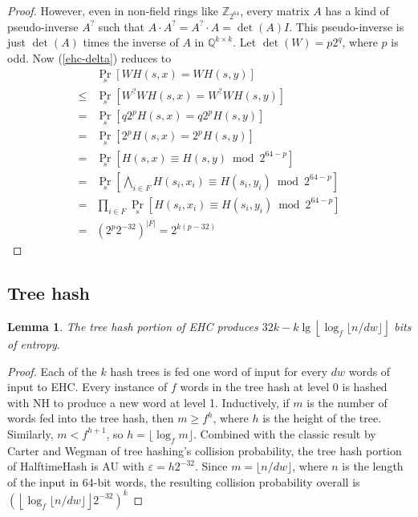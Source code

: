 \documentclass[sigconf, nonacm]{acmart}
\newtheorem*{lemma}{Lemma}
\newcommand{\rats}{\mathbb{Q}}
\newcommand{\ints}{\mathbb{Z}}
\begin{document}
\begin{proof}
However, even in non-field rings like $\ints_{2^{64}}$, every matrix $A$ has a kind of pseudo-inverse $A^?$ such that $A \cdot A^? = A^? \cdot A = \det(A) I$.
This pseudo-inverse is just $\det(A)$ times the inverse of $A$ in $\rats^{k\times{}k}$.
Let $\det(W) = p2^q$, where $p$ is odd.
Now (\ref{ehc-delta}) reduces to
\[
\begin{array}{rl}
  &  \Pr_s[W H(s,x) = W H(s,y)]\\
  \leq & \Pr_s[W^?WH(s,x) = W^?WH(s,y)] \\
  = & \Pr_s[q2^pH(s,x) = q2^pH(s,y)] \\
  = & \Pr_s[2^pH(s,x) = 2^pH(s,y)] \\
  = & \Pr_s[H(s,x) \equiv H(s,y) \bmod 2^{64-p}] \\
  = & \Pr_s\left[\bigwedge_{i \in F} H(s_i,x_i) \equiv H(s_i,y_i) \bmod 2^{64-p}\right] \\
  = & \prod_{i \in F} \Pr_s\left[ H(s_i,x_i) \equiv H(s_i,y_i) \bmod 2^{64-p}\right] \\
  = & \left(2^p 2^{-32}\right)^{|F|} = 2^{k(p-32)}
\end{array}
\]
\end{proof}

\subsection{Tree hash}

\begin{lemma}
The tree hash portion of EHC produces $32k - k\lg\left\lfloor\log_f \lfloor n/dw\rfloor\right\rfloor$ bits of entropy.
\end{lemma}
\begin{proof}
Each of the $k$ hash trees is fed one word of input for every $dw$ words of input to EHC.
Every instance of $f$ words in the tree hash at level 0 is hashed with NH to produce a new word at level 1.
Inductively, if $m$ is the number of words fed into the tree hash, then $m \geq f^h$, where $h$ is the height of the tree.
Similarly, $m < f^{h+1}$, so $h = \lfloor \log_f m \rfloor$.
Combined with the classic result by Carter and Wegman of tree hashing's collision probability, the tree hash portion of HalftimeHash is AU with $\varepsilon = h 2^{-32}$.
Since $m = \lfloor n / d w \rfloor$, where $n$ is the length of the input in 64-bit words, the resulting collision probability overall is $\left(\left\lfloor \log_f \lfloor n / d w \rfloor \right\rfloor 2^{-32}\right)^k$
\end{proof}
\end{document}
